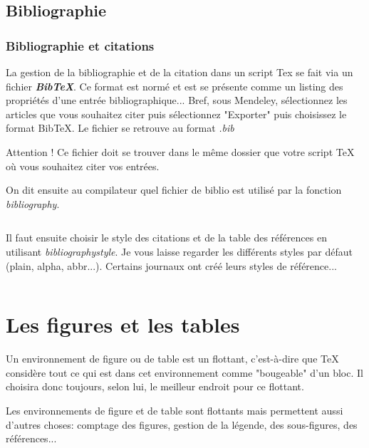 \documentclass{beamer}
\begin{document}
\subsection[Biblio]{Bibliographie}
\begin{frame}[fragile]
	\frametitle{Bibliographie et citations}
	La gestion de la bibliographie et de la citation dans un script Tex se fait via un fichier \textit{\textbf{BibTeX}}. Ce format est normé et est se présente comme un listing des propriétés d'une entrée bibliographique... Bref, sous Mendeley, sélectionnez les articles que vous souhaitez citer puis sélectionnez "Exporter" puis choisissez le format BibTeX. Le fichier se retrouve au format \textit{.bib}
	\newline
	
	\alert{Attention !} Ce fichier doit se trouver dans le même dossier que votre script TeX où vous souhaitez citer vos entrées.
\end{frame}

\begin{frame}[fragile]
On dit ensuite au compilateur quel fichier de biblio est utilisé par la fonction \textit{bibliography}.

\begin{Verbatim}

\end{Verbatim}
\vspace{.2cm}
Il faut ensuite choisir le style des citations et de la table des références en utilisant \textit{bibliographystyle}. Je vous laisse regarder les différents styles par défaut (plain, alpha, abbr...). Certains journaux ont créé leurs styles de référence...

\begin{Verbatim}

\end{Verbatim}
\end{frame}

\section{Les figures et les tables}
\begin{frame}[fragile]

\begin{definition}
Un environnement de figure ou de table est un flottant, c'est-à-dire que TeX considère tout ce qui est dans cet environnement comme "bougeable" d'un bloc. Il choisira donc toujours, selon lui, le meilleur endroit pour ce flottant.
\end{definition}
\vspace{.4cm}
Les environnements de figure et de table sont flottants mais permettent aussi d'autres choses: comptage des figures, gestion de la légende, des sous-figures, des références...

\end{frame}
\end{document}
